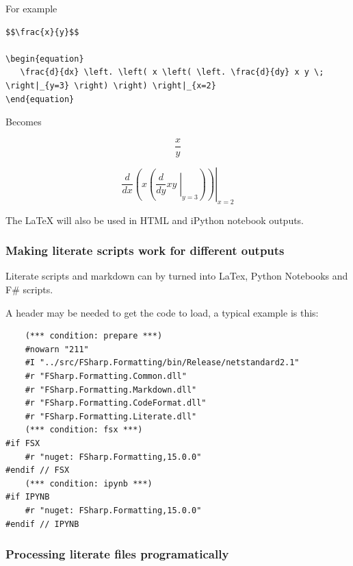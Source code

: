 \documentclass{article}
\begin{document}
For example
\begin{lstlisting}
$$\frac{x}{y}$$

\begin{equation}
   \frac{d}{dx} \left. \left( x \left( \left. \frac{d}{dy} x y \; \right|_{y=3} \right) \right) \right|_{x=2}
\end{equation}

\end{lstlisting}


Becomes


\begin{equation}
\frac{x}{y}
\end{equation}




\begin{equation}
   \frac{d}{dx} \left. \left( x \left( \left. \frac{d}{dy} x y \; \right|_{y=3} \right) \right) \right|_{x=2}
\end{equation}




The LaTeX will also be used in HTML and iPython notebook outputs.
\subsubsection*{Making literate scripts work for different outputs}



Literate scripts and markdown can by turned into LaTex, Python Notebooks and F\# scripts.


A header may be needed to get the code to load, a typical example is this:
\begin{lstlisting}
    (*** condition: prepare ***)
    #nowarn "211"
    #I "../src/FSharp.Formatting/bin/Release/netstandard2.1"
    #r "FSharp.Formatting.Common.dll"
    #r "FSharp.Formatting.Markdown.dll"
    #r "FSharp.Formatting.CodeFormat.dll"
    #r "FSharp.Formatting.Literate.dll"
    (*** condition: fsx ***)
#if FSX
    #r "nuget: FSharp.Formatting,15.0.0"
#endif // FSX
    (*** condition: ipynb ***)
#if IPYNB
    #r "nuget: FSharp.Formatting,15.0.0"
#endif // IPYNB

\end{lstlisting}
\subsubsection*{Processing literate files programatically}
\end{document}
